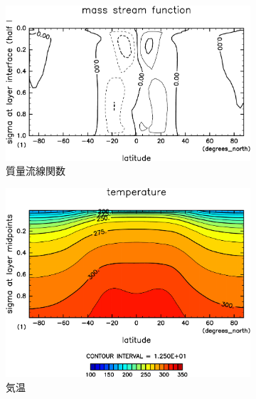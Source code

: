 \documentclass[body]{subfiles}
\begin{document}
\begin{figure}[t]
\begin{subfigure}{.4\textwidth}
		\centering
		\includegraphics[width=\columnwidth]{S1500-nc/MSF,time=3650:4015-crop-rotate.pdf}
		\caption{質量流線関数\hmu*{[kg/s]}}\label{S1500nc質量流線関数}
	\end{subfigure}
	\begin{subfigure}{.4\textwidth}
		\centering
		\includegraphics[width=\columnwidth]{S1500-nc/Temp,time=3650:4015-crop-rotate.pdf}
		\caption{気温\hmu*{[K]}}\label{S1500nc気温分布}
	\end{subfigure}
	\begin{subfigure}{.4\textwidth}
		\centering

\end{subfigure}
\end{figure}
\end{document}
